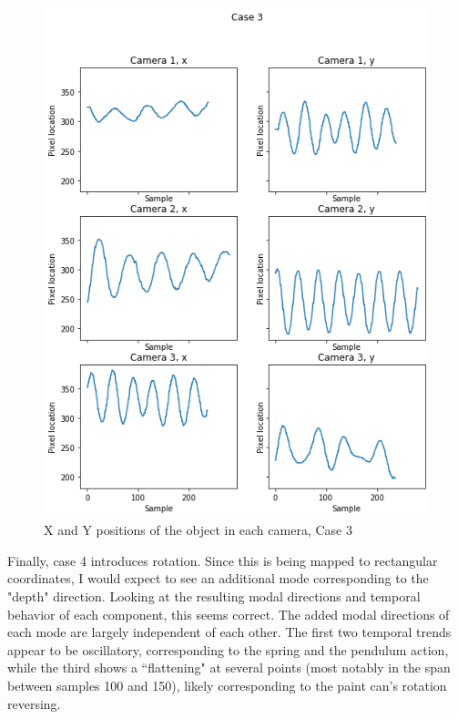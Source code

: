 \documentclass[journal]{IEEEtran}
\begin{document}
\begin{figure}
    \centerline{\includegraphics[width=\columnwidth]{case3.png}}
    \caption{X and Y positions of the object in each camera, Case 3}
    \label{case3}
\end{figure}

Finally, case 4 introduces rotation. Since this is being mapped to rectangular coordinates,
I would expect to see an additional mode corresponding to the "depth" direction. Looking at the
resulting modal directions and temporal behavior of each component, this seems correct. The added
modal directions of each mode are largely independent of each other. The first two temporal trends
appear to be oscillatory, corresponding to the spring and the pendulum action, while the third
shows a ``flattening" at several points (most notably in the span between samples 100 and 150),
likely corresponding to the paint can's rotation reversing.
\end{document}
